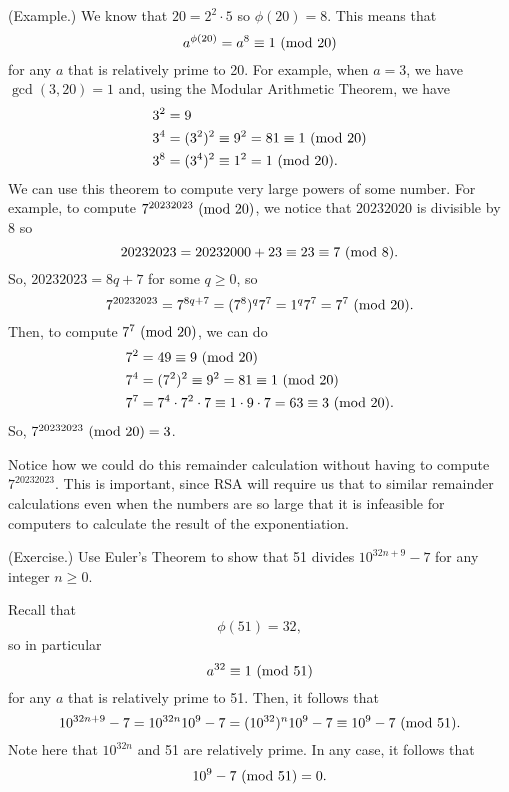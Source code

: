 \documentclass[letterpaper]{article}
\begin{document}
\begin{mdframed}
    (Example.) We know that $20 = 2^2 \cdot 5$ so $\phi(20) = 8$. This means that \[a^{\phi(20)} = a^8 \equiv 1 \ (\mathrm{mod}\ 20)\] for any $a$ that is relatively prime to 20. For example, when $a = 3$, we have $\gcd(3, 20) = 1$ and, using the Modular Arithmetic Theorem, we have 
    \begin{equation*}
        \begin{aligned}
            &3^2 = 9 \\ 
            &3^4 = (3^2)^2 \equiv 9^2 = 81 \equiv 1 \ (\mathrm{mod}\ 20) \\ 
            &3^8 = (3^4)^2 \equiv 1^2 = 1 \ (\mathrm{mod}\ 20).
        \end{aligned}
    \end{equation*}
    We can use this theorem to compute very large powers of some number. For example, to compute $7^{20232023} \ (\mathrm{mod}\ 20)$, we notice that $20232020$ is divisible by 8 so 
    \[20232023 = 20232000 + 23 \equiv 23 \equiv 7 \ (\mathrm{mod}\ 8).\]
    So, $20232023 = 8q + 7$ for some $q \geq 0$, so 
    \[7^{20232023} = 7^{8q + 7} = (7^8)^q 7^7 = 1^q 7^7 = 7^7 \ (\mathrm{mod}\ 20).\]
    Then, to compute $7^7 \ (\mathrm{mod}\ 20)$, we can do 
    \begin{equation*}
        \begin{aligned}
            &7^2 = 49 \equiv 9 \ (\mathrm{mod}\ 20) \\ 
            &7^4 = (7^2)^2 \equiv 9^2 = 81 \equiv 1 \ (\mathrm{mod}\ 20) \\ 
            &7^7 = 7^4 \cdot 7^2 \cdot 7 \equiv 1 \cdot 9 \cdot 7 = 63 \equiv 3 \ (\mathrm{mod}\ 20).
        \end{aligned}
    \end{equation*}
    So, $7^{20232023} \ (\mathrm{mod}\ 20) = 3$. 
\end{mdframed}
Notice how we could do this remainder calculation without having to compute $7^{20232023}$. This is important, since RSA will require us that to similar remainder calculations even when the numbers are so large that it is infeasible for computers to calculate the result of the exponentiation. 

\begin{mdframed}
    (Exercise.) Use Euler's Theorem to show that 51 divides $10^{32n + 9} - 7$ for any integer $n \geq 0$. 

    \begin{mdframed}
        Recall that \[\phi(51) = 32,\] so in particular \[a^{32} \equiv 1 \ (\mathrm{mod}\ 51)\] for any $a$ that is relatively prime to 51. Then, it follows that 
        \[10^{32n + 9} - 7 = 10^{32n} 10^9 - 7 = (10^{32})^{n} 10^9 - 7 \equiv 10^9 - 7 \ (\mathrm{mod}\ 51).\] Note here that $10^{32n}$ and 51 are relatively prime. In any case, it follows that 
        \[10^9 - 7 \ (\mathrm{mod}\ 51) = 0.\]
    \end{mdframed}
\end{mdframed}
\end{document}

